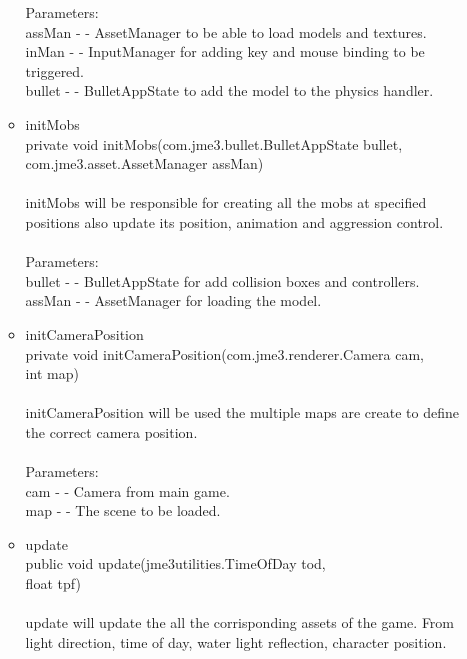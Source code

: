 \documentclass[letterpaper]{article}
\begin{document}
\begin{itemize}
\begin{itemize}
													Parameters: \\
													assMan - - AssetManager to be able to load models and textures. \\
													inMan - - InputManager for adding key and mouse binding to be triggered. \\
													bullet - - BulletAppState to add the model to the physics handler.
											\item	initMobs \\
													private void initMobs(com.jme3.bullet.BulletAppState bullet, \\
				            com.jme3.asset.AssetManager assMan) \\ \\
													initMobs will be responsible for creating all the mobs at specified positions also update its position, animation and aggression control. \\ \\
													Parameters: \\
													bullet - - BulletAppState for add collision boxes and controllers. \\
													assMan - - AssetManager for loading the model. \\
											\item	initCameraPosition \\
													private void initCameraPosition(com.jme3.renderer.Camera cam, \\
				                      int map) \\ \\
													initCameraPosition will be used the multiple maps are create to define the correct camera position. \\ \\
													Parameters: \\
													cam - - Camera from main game. \\
													map - - The scene to be loaded. \\
											\item	update \\
													public void update(jme3utilities.TimeOfDay tod, \\
				          float tpf) \\ \\
													update will update the all the corrisponding assets of the game. From light direction, time of day, water light reflection, character position. \\ \\

\end{itemize}
\end{itemize}
\end{document}
